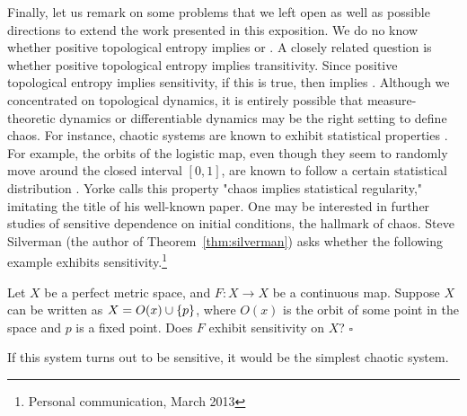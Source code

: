 \documentclass[10pt,twoside,draft]{book}
\begin{document}
Finally, let us remark on some problems that we left open as well as possible directions to extend the work presented in this exposition.
We do no know whether positive topological entropy implies \wig or \blcp.
A closely related question is whether positive topological entropy implies transitivity. 
Since positive topological entropy implies sensitivity, if this is true, then \akm implies \wig.
Although we concentrated on topological dynamics, it is entirely possible that measure-theoretic dynamics or differentiable dynamics \cite{smale} may be the right setting to define chaos.
For instance, chaotic systems are known to exhibit statistical properties \citep{lasota}.
For example, the orbits of the logistic map, even though they seem to randomly move around the closed interval $[0,1]$, are known to follow a certain statistical distribution \citep{sternberg}.
Yorke calls this property "chaos implies statistical regularity," imitating the title of his well-known paper. \citep{ueda-abraham}
One may be interested in further studies of sensitive dependence on initial conditions, the hallmark of chaos.
Steve Silverman (the author of Theorem~\ref{thm:silverman}) asks whether the following example exhibits sensitivity.\footnote{Personal communication, March 2013}
\begin{example}
  Let $X$ be a perfect metric space, and $F: X \to X$ be a continuous map.
  Suppose $X$ can be written as $X = O(x) \cup \left \{ p \right \}$, where $O(x)$ is the orbit of some point in the space and $p$ is a fixed point.
  Does $F$ exhibit sensitivity on $X$?
  $\square$
\end{example}
If this system turns out to be sensitive, it would be the simplest chaotic system.



\end{document}
